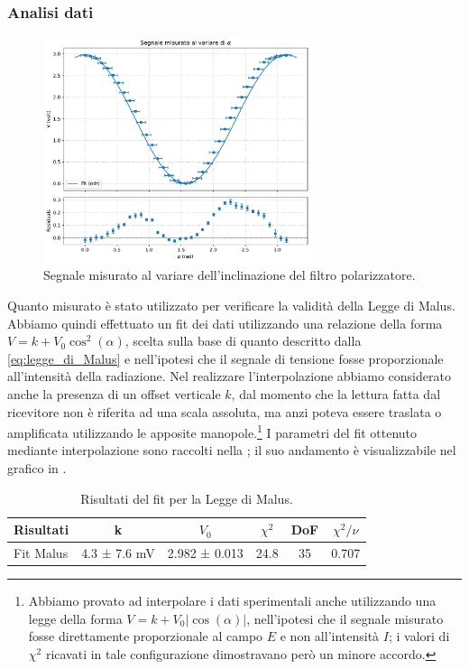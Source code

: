 \documentclass[a4paper]{article}
\begin{document}
\subsubsection{Analisi dati}
\begin{figure}[htbp]
	\centering
	\includegraphics[width=0.7\textwidth]{grafici/Malus.pdf}
	\caption{Segnale misurato al variare dell'inclinazione del filtro polarizzatore.}
	\label{fig:Malus_grafico}
\end{figure}
Quanto misurato è stato utilizzato per verificare la validità della Legge di Malus. Abbiamo quindi effettuato un fit dei dati utilizzando una relazione della forma $V = k+V_0\cos^2(\alpha)$, scelta sulla base di quanto descritto dalla \cref{eq:legge_di_Malus} e nell'ipotesi che il segnale di tensione fosse proporzionale all'intensità della radiazione. Nel realizzare l'interpolazione abbiamo considerato anche la presenza di un offset verticale $k$, dal momento che la lettura fatta dal ricevitore non è riferita ad una scala assoluta, ma anzi poteva essere traslata o amplificata utilizzando le apposite manopole.\footnote{Abbiamo provato ad interpolare i dati sperimentali anche utilizzando una legge della forma $V = k + V_0|\cos(\alpha)|$, nell'ipotesi che il segnale misurato fosse direttamente proporzionale al campo $E$ e non all'intensità $I$; i valori di $\chi^2$ ricavati in tale configurazione dimostravano però un minore accordo.} I parametri del fit ottenuto mediante interpolazione sono raccolti nella ; il suo andamento è visualizzabile nel grafico in .
\begin{table}[htbp]
\centering
\begin{tabular}{|l|ccccc|}
\hline
Risultati & k & $V_0$ & $\chi^2$ & DoF & $\chi^2/\nu$ \\\hline\hline
Fit Malus & 4.3 ± 7.6 mV & 2.982 ± 0.013 & 24.8 & 35 & 0.707 \\\hline
\end{tabular}
\caption{Risultati del fit per la Legge di Malus.}
\label{tab:fit_Malus}
\end{table}
\end{document}
